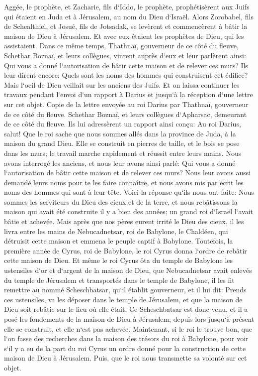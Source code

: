 \verse Aggée, le prophète, et Zacharie, fils d`Iddo, le prophète, prophétisèrent aux Juifs qui étaient en Juda et à Jérusalem, au nom du Dieu d`Israël. 
\verse Alors Zorobabel, fils de Schealthiel, et Josué, fils de Jotsadak, se levèrent et commencèrent à bâtir la maison de Dieu à Jérusalem. Et avec eux étaient les prophètes de Dieu, qui les assistaient. 
\verse Dans ce même temps, Thathnaï, gouverneur de ce côté du fleuve, Schethar Boznaï, et leurs collègues, vinrent auprès d`eux et leur parlèrent ainsi: Qui vous a donné l`autorisation de bâtir cette maison et de relever ces murs? 
\verse Ils leur dirent encore: Quels sont les noms des hommes qui construisent cet édifice? 
\verse Mais l`oeil de Dieu veillait sur les anciens des Juifs. Et on laissa continuer les travaux pendant l`envoi d`un rapport à Darius et jusqu`à la réception d`une lettre sur cet objet. 
\verse Copie de la lettre envoyée au roi Darius par Thathnaï, gouverneur de ce côté du fleuve. Schethar Boznaï, et leurs collègues d`Apharsac, demeurant de ce côté du fleuve. 
\verse Ils lui adressèrent un rapport ainsi conçu: Au roi Darius, salut! 
\verse Que le roi sache que nous sommes allés dans la province de Juda, à la maison du grand Dieu. Elle se construit en pierres de taille, et le bois se pose dans les murs; le travail marche rapidement et réussit entre leurs mains. 
\verse Nous avons interrogé les anciens, et nous leur avons ainsi parlé: Qui vous a donné l`autorisation de bâtir cette maison et de relever ces murs? 
\verse Nous leur avons aussi demandé leurs noms pour te les faire connaître, et nous avons mis par écrit les noms des hommes qui sont à leur tête. 
\verse Voici la réponse qu`ils nous ont faite: Nous sommes les serviteurs du Dieu des cieux et de la terre, et nous rebâtissons la maison qui avait été construite il y a bien des années; un grand roi d`Israël l`avait bâtie et achevée. 
\verse Mais après que nos pères eurent irrité le Dieu des cieux, il les livra entre les mains de Nebucadnetsar, roi de Babylone, le Chaldéen, qui détruisit cette maison et emmena le peuple captif à Babylone. 
\verse Toutefois, la première année de Cyrus, roi de Babylone, le roi Cyrus donna l`ordre de rebâtir cette maison de Dieu. 
\verse Et même le roi Cyrus ôta du temple de Babylone les ustensiles d`or et d`argent de la maison de Dieu, que Nebucadnetsar avait enlevés du temple de Jérusalem et transportés dans le temple de Babylone, il les fit remettre au nommé Scheschbatsar, qu`il établit gouverneur, 
\verse et il lui dit: Prends ces ustensiles, va les déposer dans le temple de Jérusalem, et que la maison de Dieu soit rebâtie sur le lieu où elle était. 
\verse Ce Scheschbatsar est donc venu, et il a posé les fondements de la maison de Dieu à Jérusalem; depuis lors jusqu`à présent elle se construit, et elle n`est pas achevée. 
\verse Maintenant, si le roi le trouve bon, que l`on fasse des recherches dans la maison des trésors du roi à Babylone, pour voir s`il y a eu de la part du roi Cyrus un ordre donné pour la construction de cette maison de Dieu à Jérusalem. Puis, que le roi nous transmette sa volonté sur cet objet. 


